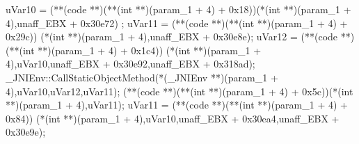 \documentclass[
]{article}
\newenvironment{Shaded}{}{}
\newcommand{\BaseNTok}[1]{\textcolor[rgb]{0.25,0.63,0.44}{#1}}
\newcommand{\DataTypeTok}[1]{\textcolor[rgb]{0.56,0.13,0.00}{#1}}
\newcommand{\DecValTok}[1]{\textcolor[rgb]{0.25,0.63,0.44}{#1}}
\newcommand{\NormalTok}[1]{#1}
\newcommand{\OperatorTok}[1]{\textcolor[rgb]{0.40,0.40,0.40}{#1}}
\begin{document}
\begin{Shaded}
\begin{Highlighting}[]
\NormalTok{  uVar10 }\OperatorTok{=} \OperatorTok{(**(}\NormalTok{code }\OperatorTok{**)(**(}\DataTypeTok{int} \OperatorTok{**)(}\NormalTok{param\_1 }\OperatorTok{+} \DecValTok{4}\OperatorTok{)} \OperatorTok{+} \BaseNTok{0x18}\OperatorTok{))(*(}\DataTypeTok{int} \OperatorTok{**)(}\NormalTok{param\_1 }\OperatorTok{+} \DecValTok{4}\OperatorTok{),}\NormalTok{unaff\_EBX }\OperatorTok{+} \BaseNTok{0x30e72}\OperatorTok{)}
  \OperatorTok{;}
\NormalTok{  uVar11 }\OperatorTok{=} \OperatorTok{(**(}\NormalTok{code }\OperatorTok{**)(**(}\DataTypeTok{int} \OperatorTok{**)(}\NormalTok{param\_1 }\OperatorTok{+} \DecValTok{4}\OperatorTok{)} \OperatorTok{+} \BaseNTok{0x29c}\OperatorTok{))}
                     \OperatorTok{(*(}\DataTypeTok{int} \OperatorTok{**)(}\NormalTok{param\_1 }\OperatorTok{+} \DecValTok{4}\OperatorTok{),}\NormalTok{unaff\_EBX }\OperatorTok{+} \BaseNTok{0x30e8e}\OperatorTok{);}
\NormalTok{  uVar12 }\OperatorTok{=} \OperatorTok{(**(}\NormalTok{code }\OperatorTok{**)(**(}\DataTypeTok{int} \OperatorTok{**)(}\NormalTok{param\_1 }\OperatorTok{+} \DecValTok{4}\OperatorTok{)} \OperatorTok{+} \BaseNTok{0x1c4}\OperatorTok{))}
                     \OperatorTok{(*(}\DataTypeTok{int} \OperatorTok{**)(}\NormalTok{param\_1 }\OperatorTok{+} \DecValTok{4}\OperatorTok{),}\NormalTok{uVar10}\OperatorTok{,}\NormalTok{unaff\_EBX }\OperatorTok{+} \BaseNTok{0x30e92}\OperatorTok{,}\NormalTok{unaff\_EBX }\OperatorTok{+} \BaseNTok{0x318ad}\OperatorTok{);}
\NormalTok{  \_JNIEnv}\OperatorTok{::}\NormalTok{CallStaticObjectMethod}\OperatorTok{(*(}\NormalTok{\_JNIEnv }\OperatorTok{**)(}\NormalTok{param\_1 }\OperatorTok{+} \DecValTok{4}\OperatorTok{),}\NormalTok{uVar10}\OperatorTok{,}\NormalTok{uVar12}\OperatorTok{,}\NormalTok{uVar11}\OperatorTok{);}
  \OperatorTok{(**(}\NormalTok{code }\OperatorTok{**)(**(}\DataTypeTok{int} \OperatorTok{**)(}\NormalTok{param\_1 }\OperatorTok{+} \DecValTok{4}\OperatorTok{)} \OperatorTok{+} \BaseNTok{0x5c}\OperatorTok{))(*(}\DataTypeTok{int} \OperatorTok{**)(}\NormalTok{param\_1 }\OperatorTok{+} \DecValTok{4}\OperatorTok{),}\NormalTok{uVar11}\OperatorTok{);}
\NormalTok{  uVar11 }\OperatorTok{=} \OperatorTok{(**(}\NormalTok{code }\OperatorTok{**)(**(}\DataTypeTok{int} \OperatorTok{**)(}\NormalTok{param\_1 }\OperatorTok{+} \DecValTok{4}\OperatorTok{)} \OperatorTok{+} \BaseNTok{0x84}\OperatorTok{))}
                     \OperatorTok{(*(}\DataTypeTok{int} \OperatorTok{**)(}\NormalTok{param\_1 }\OperatorTok{+} \DecValTok{4}\OperatorTok{),}\NormalTok{uVar10}\OperatorTok{,}\NormalTok{unaff\_EBX }\OperatorTok{+} \BaseNTok{0x30ea4}\OperatorTok{,}\NormalTok{unaff\_EBX }\OperatorTok{+} \BaseNTok{0x30e9e}\OperatorTok{);}

\end{Highlighting}
\end{Shaded}
\end{document}
